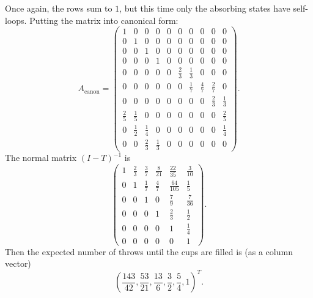 \documentclass[12pt]{article}
\begin{document}
\begin{solution}
\begin{enumerate}[label=(\alph*)]
        Once again, the rows sum to \( 1 \), but this time only the
        absorbing states have self-loops.  Putting the matrix into
        canonical form:
        \[
            A_{\text{canon}} =
            \begin{pmatrix}
                1 & 0 & 0 & 0 & 0 & 0 & 0 & 0 & 0 & 0\\
                0 & 1 & 0 & 0 & 0 & 0 & 0 & 0 & 0 & 0\\
                0 & 0 & 1 & 0 & 0 & 0 & 0 & 0 & 0 & 0\\
                0 & 0 & 0 & 1 & 0 & 0 & 0 & 0 & 0 & 0\\
                0 & 0 & 0 & 0 & 0 & \frac{2}{3} & \frac{1}{3} & 0 & 0 &
                0 \\
                0 & 0 & 0 & 0 & 0 & 0 & \frac{1}{7} & \frac{4}{7} &
                \frac{2}{7} & 0\\
                0 & 0 & 0 & 0 & 0 & 0 & 0 & 0 & \frac{2}{3} & \frac{1}{3}\\
                \frac{2}{5} & \frac{1}{5} & 0 & 0 & 0 & 0 & 0 & 0 & 0 &
                \frac{2}{5}\\
                0 & \frac{1}{2} & \frac{1}{4} & 0 & 0 & 0 & 0 & 0 & 0 &
                \frac{1}{4} \\
                0 & 0 & \frac{2}{3} & \frac{1}{3} & 0 & 0 & 0 & 0 & 0 &
                0
            \end{pmatrix}
            .
        \] The normal matrix \( (I - T)^{-1} \) is
        \[
            \begin{pmatrix}
                1 & \frac{2}{3} & \frac{3}{7} & \frac{8}{21} & \frac{22}
                {35} & \frac{3}{10}\\
                0 & 1 & \frac{1}{7} & \frac{4}{7} & \frac{64}{105} &
                \frac{1} {5}\\
                0 & 0 & 1 & 0 & \frac{7}{9} & \frac{7}{36}\\
                0 & 0 & 0 & 1 & \frac{2}{3} & \frac{1}{2}\\
                0 & 0 & 0 & 0 & 1 & \frac{1}{4}\\
                0 & 0 & 0 & 0 & 0 & 1
            \end{pmatrix}
            .
        \] Then the expected number of throws until the cups are filled
        is (as a column vector)
        \[
            \left( \frac{143}{42}, \frac{53}{21}, \frac{13}{6}, \frac{3}
            {2}, \frac{5}{4}, 1 \right)^{T}.
        \]


\end{enumerate}
\end{solution}
\end{document}
